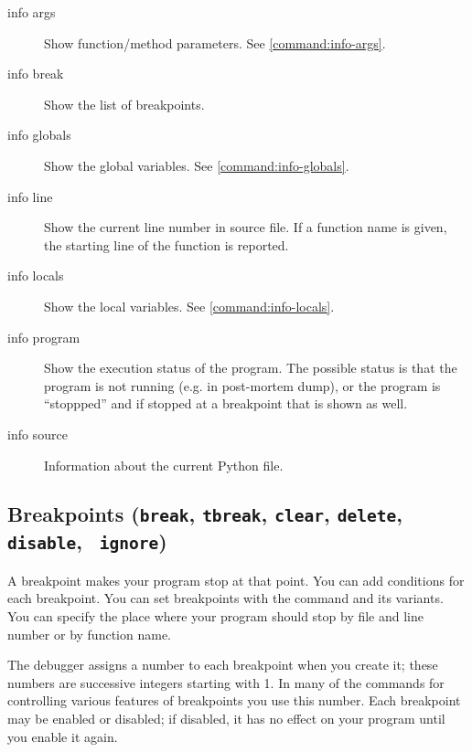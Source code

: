 \begin{description}

\item[info args]

Show function/method parameters. See \ref{command:info-args}.

\item[info break]

Show the list of breakpoints. 

\item[info globals]

Show the global variables. See \ref{command:info-globals}. 

\item[info line]

Show the current line number in source file. If a function name is
given, the starting line of the function is reported.

\item[info locals]

Show the local variables. See \ref{command:info-locals}. 

\item[info program]

Show the execution status of the program. The possible status is that
the program is not running (e.g. in post-mortem dump), or the program is
``stoppped'' and if stopped at a breakpoint that is shown as well.

\item[info source]

Information about the current Python file.

\end{description}

\subsection{Breakpoints ({\tt break}, {\tt tbreak}, {\tt clear},
  {\tt delete}, {\tt disable}, {\tt
  ignore})\label{subsubsection-brkpts}}

 A breakpoint makes your program stop at that
point. You can add conditions for each breakpoint.  You can set
breakpoints with the  command and its variants. You can specify
the place where your program should stop by file and line number or by
function name.

The debugger assigns a number to each breakpoint when you create it;
these numbers are successive integers starting with 1.  In many of the
commands for controlling various features of breakpoints you use this
number.  Each breakpoint may be enabled or disabled; if disabled, it
has no effect on your program until you enable it again.


